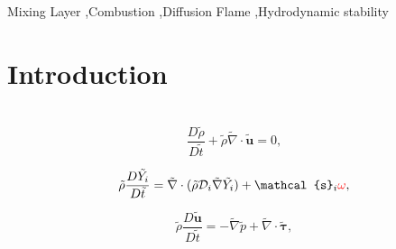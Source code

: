 \documentclass[preprint,12pt,authoryear]{elsarticle}
\begin{document}
\begin{frontmatter}
%
\begin{abstract}
\end{abstract}

\begin{keyword}
Mixing Layer  
\sep Combustion 
\sep Diffusion Flame 
\sep Hydrodynamic stability
\end{keyword}

\end{frontmatter}

\linenumbers


\section{Introduction}
%
\
\begin{equation}
 \frac{D \tilde{\rho}}{D \tilde{t}}
+\tilde{\rho} \tilde{\nabla}\cdot\tilde{\mathbf{u}}
 =0,
\label{eq:mass}  
\end{equation}

\begin{equation}
	\tilde{\rho} \frac{D  \tilde{Y_i}}{D \tilde{t}}
= 
	\tilde{\nabla}\cdot( \tilde{\rho} \mathcal{D}_i\tilde{\nabla} \tilde{Y_i})
	+
    \mathcal{s}_i {\color{red} \omega},
\label{eq:specie}  
\end{equation}

\begin{equation}
    \tilde{\rho}\frac{D  \tilde{\mathbf{u}}}{D \tilde{t}}
= - \tilde{\nabla} \tilde{p} 
  + \tilde{\nabla} \cdot \tilde{\pmb{\tau}} 
  ,
\label{eq:momentum}  
\end{equation}
\end{document}
